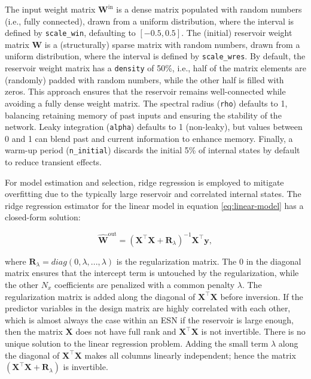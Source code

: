 The input weight matrix \(\mathbf{W^\mathrm{in}}\) is a dense matrix populated with random numbers (i.e., fully connected), drawn from a uniform distribution, where the interval is defined by \texttt{scale\_win}, defaulting to \([-0.5, 0.5]\). The (initial) reservoir weight matrix \(\mathbf{W}\) is a (structurally) sparse matrix with random numbers, drawn from a uniform distribution, where the interval is defined by \texttt{scale\_wres}. By default, the reservoir weight matrix has a \texttt{density} of 50\%, i.e., half of the matrix elements are (randomly) padded with random numbers, while the other half is filled with zeros. This approach ensures that the reservoir remains well-connected while avoiding a fully dense weight matrix. The spectral radius (\texttt{rho}) defaults to 1, balancing retaining memory of past inputs and ensuring the stability of the network. Leaky integration (\texttt{alpha}) defaults to 1 (non-leaky), but values between 0 and 1 can blend past and current information to enhance memory. Finally, a warm-up period (\texttt{n\_initial}) discards the initial 5\% of internal states by default to reduce transient effects.

For model estimation and selection, ridge regression is employed to mitigate overfitting due to the typically large reservoir and correlated internal states. The ridge regression estimator for the linear model in equation \eqref{eq:linear-model} has a closed-form solution:

\begin{equation}
\mathbf{\widehat{W}}^\mathrm{out} = \left(\mathbf{X}^\top \mathbf{X} + \mathbf{R}_{\lambda}\right)^{-1}\mathbf{X}^\top\mathbf{y},
\label{eq:estimator}
\end{equation}

where \(\mathbf{R}_{\lambda} = diag(0, \lambda, ..., \lambda)\) is the regularization matrix. The \(0\) in the diagonal matrix ensures that the intercept term is untouched by the regularization, while the other \(N_x\) coefficients are penalized with a common penalty \(\lambda\). The regularization matrix is added along the diagonal of \(\mathbf{X}^{\top}\mathbf{X}\) before inversion. If the predictor variables in the design matrix are highly correlated with each other, which is almost always the case within an ESN if the reservoir is large enough, then the matrix \(\mathbf{X}\) does not have full rank and \(\mathbf{X}^{\top}\mathbf{X}\) is not invertible. There is no unique solution to the linear regression problem. Adding the small term \(\lambda\) along the diagonal of \(\mathbf{X}^{\top}\mathbf{X}\) makes all columns linearly independent; hence the matrix \((\mathbf{X}^{\top}\mathbf{X} + \mathbf{R}_{\lambda})\) is invertible.

